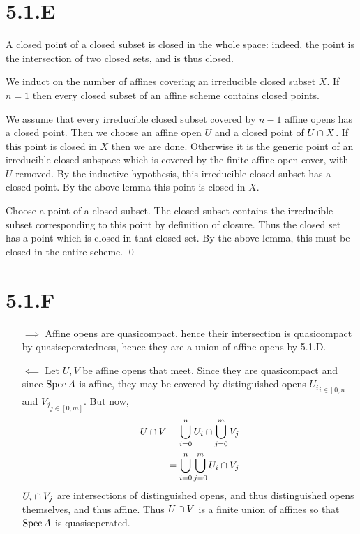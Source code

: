 \documentclass{article}
\begin{document}
\section{5.1.E}
A closed point of a closed subset is closed in the whole space: indeed, the point is the intersection of two closed sets, and is thus closed.

We induct on the number of affines covering an irreducible closed subset $X$. If $n=1$ then every closed subset of an affine scheme contains closed points.

We assume that every irreducible closed subset covered by $n-1$ affine opens has a closed point. Then we choose an affine open $U$ and a closed point of $U \cap X$. If this point is closed in $X$ then we are done. Otherwise it is the generic point of an irreducible closed subspace which is covered by the finite affine open cover, with $U$ removed. By the inductive hypothesis, this irreducible closed subset has a closed point. By the above lemma this point is closed in $X$.

Choose a point of a closed subset. The closed subset contains the irreducible subset corresponding to this point by definition of closure. Thus the closed set has a point which is closed in that closed set. By the above lemma, this must be closed in the entire scheme. \qed

\section{5.1.F}
\begin{enumerate}[a.]
    \item [$\implies$] Affine opens are quasicompact, hence their intersection is quasicompact by quasiseperatedness, hence they are a union of affine opens by 5.1.D.
    \item [$\impliedby$] Let $U, V$ be affine opens that meet. Since they are quasicompact and since $\operatorname{Spec} A$ is affine, they may be covered by distinguished opens ${U_i}_{i \in [0,n]}$ and ${V_j}_{j \in [0,m]}$. But now,
          \begin{align*}
              U \cap V & = \bigcup_{i=0}^n U_i \cap \bigcup_{j=0}^m V_j \\
                             & = \bigcup_{i=0}^n \bigcup_{j=0}^m U_i \cap V_j
          \end{align*}
          $U_i \cap V_j$ are intersections of distinguished opens, and thus distinguished opens themselves, and thus affine. Thus $U \cap V$ is a finite union of affines so that $\operatorname{Spec} A$ is quasiseperated.
\end{enumerate}
\end{document}
